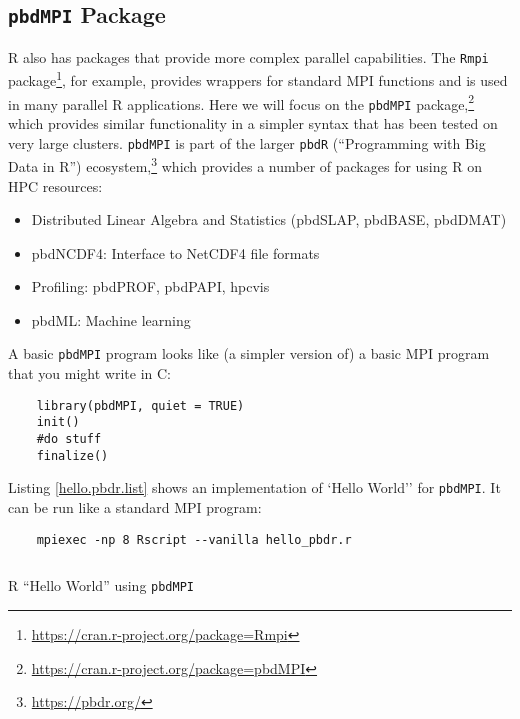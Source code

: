 \subsection{\texttt{pbdMPI} Package}
R also has packages that provide more complex parallel capabilities. The \texttt{Rmpi} package\footnote{\url{https://cran.r-project.org/package=Rmpi}}, for example, provides wrappers for standard MPI functions and is used in many parallel R applications. Here we will focus on the \texttt{pbdMPI} package,\footnote{\url{https://cran.r-project.org/package=pbdMPI}} which provides similar functionality in a simpler syntax that has been tested on very large clusters. \texttt{pbdMPI} is part of the larger \texttt{pbdR} (``Programming with Big Data in R'') ecosystem,\footnote{\url{https://pbdr.org/}} which provides a number of packages for using R on HPC resources:
\begin{itemize}
    \item Distributed Linear Algebra and Statistics (pbdSLAP, pbdBASE, pbdDMAT)
    \item pbdNCDF4: Interface to NetCDF4 file formats
    \item Profiling: pbdPROF, pbdPAPI, hpcvis
    \item pbdML: Machine learning
\end{itemize}

A basic \texttt{pbdMPI} program looks like (a simpler version of) a basic MPI program that you might write in C:
\begin{verbatim}
    library(pbdMPI, quiet = TRUE)
    init()
    #do stuff
    finalize()
\end{verbatim}

Listing \ref{hello.pbdr.list} shows an implementation of `Hello World'' for \texttt{pbdMPI}. It can be run like a standard MPI program:
\begin{verbatim}
    mpiexec -np 8 Rscript --vanilla hello_pbdr.r
\end{verbatim}

\begin{listing}[ht]
\inputminted{R}{code/L22/hello_pbdr.r}
\caption{R ``Hello World'' using \texttt{pbdMPI}}
\label{hello.pbdr.list}
\end{listing}

